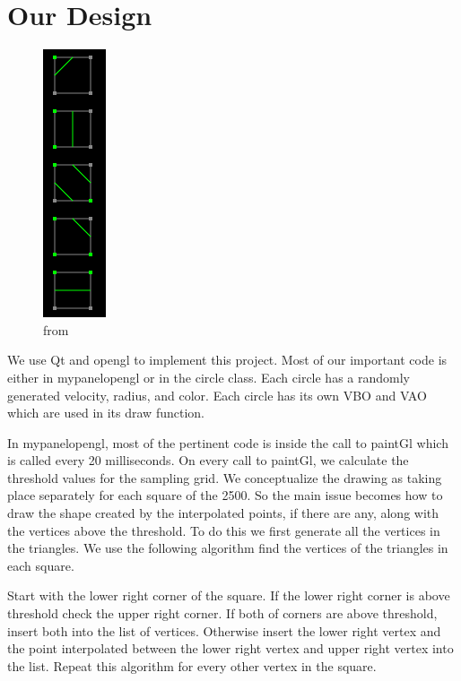 \documentclass{article}
\begin{document}
\section*{Our Design}
\begin{figure}
\begin{center}
    \includegraphics[scale = 0.5]{msquares2}
    \caption{from \cite{Wong}}
\end{center}
\end{figure}
We use Qt and opengl to implement this project. Most of our important code is either in mypanelopengl or in the circle class. Each circle has a randomly generated velocity, radius, and color. Each circle has its own VBO and VAO which are used in its draw function. 

In mypanelopengl, most of the pertinent code is inside the call to paintGl which is called every 20 milliseconds. On every call to paintGl, we calculate the threshold values for the sampling grid. We conceptualize the drawing as taking place separately for each square of the 2500. So the main issue becomes how to draw the shape created by the interpolated points, if there are any, along with the vertices above the threshold. To do this we first generate all the vertices in the triangles. We use the following algorithm find the vertices of the triangles in each square.

Start with the lower right corner of the square. If the lower right corner is above threshold check the upper right corner. If both of corners are above threshold, insert both into the list of vertices. Otherwise insert the lower right vertex and the point interpolated between the lower right vertex and upper right vertex into the list. Repeat this algorithm for every other vertex in the square. 
\end{document}
